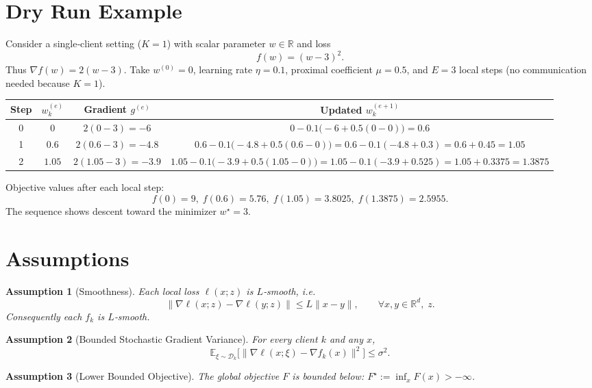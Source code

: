 \documentclass{article}
\newcommand{\E}{\mathbb{E}}
\newcommand{\R}{\mathbb{R}}
\newtheorem{assumption}{Assumption}
\begin{document}
\section*{Dry Run Example}
Consider a single‑client setting ($K=1$) with scalar parameter $w\in\R$ and loss
\[
f(w)= (w-3)^2 .
\]
Thus $\nabla f(w)=2(w-3)$.  
Take $w^{(0)}=0$, learning rate $\eta=0.1$, proximal coefficient $\mu=0.5$,
and $E=3$ local steps (no communication needed because $K=1$).

\medskip
\begin{tabular}{@{}c|c|c|c@{}}
\toprule
Step & $w_{k}^{(e)}$ & Gradient $g^{(e)}$ & Updated $w_{k}^{(e+1)}$ \\
\midrule
0 & $0$ & $2(0-3)=-6$ & $0-0.1\bigl(-6+0.5(0-0)\bigr)=0.6$ \\
1 & $0.6$ & $2(0.6-3)=-4.8$ & $0.6-0.1\bigl(-4.8+0.5(0.6-0)\bigr)=0.6-0.1(-4.8+0.3)=0.6+0.45=1.05$ \\
2 & $1.05$ & $2(1.05-3)=-3.9$ & $1.05-0.1\bigl(-3.9+0.5(1.05-0)\bigr)=1.05-0.1(-3.9+0.525)=1.05+0.3375=1.3875$ \\
\bottomrule
\end{tabular}

Objective values after each local step:
\[
f(0)=9,\; f(0.6)=5.76,\; f(1.05)=3.8025,\; f(1.3875)=2.5955.
\]
The sequence shows descent toward the minimizer $w^\star=3$.

\section*{Assumptions}
\begin{assumption}[Smoothness]
Each local loss $\ell(x;z)$ is $L$‑smooth, i.e.
\[
\|\nabla \ell(x;z)-\nabla \ell(y;z)\|\le L\|x-y\|,\qquad\forall x,y\in\R^d,\;z.
\]
Consequently each $f_k$ is $L$‑smooth.
\end{assumption}

\begin{assumption}[Bounded Stochastic Gradient Variance]
For every client $k$ and any $x$,
\[
\E_{\xi\sim\mathcal{D}_k}\!\bigl[\|\nabla \ell(x;\xi)-\nabla f_k(x)\|^2\bigr]\le\sigma^2 .
\]
\end{assumption}

\begin{assumption}[Lower Bounded Objective]
The global objective $F$ is bounded below: $F^\star:=\inf_{x}F(x)>-\infty$.
\end{assumption}
\end{document}
